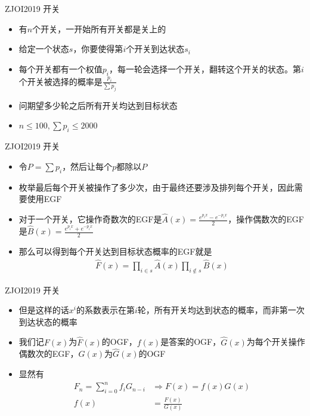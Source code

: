 \documentclass{beamer}
\begin{document}
\begin{frame}{ZJOI2019 开关}
    \begin{itemize}
        \item 有$n$个开关，一开始所有开关都是关上的
        \item 给定一个状态$s$，你要使得第$i$个开关到达状态$s_i$
        \item 每个开关都有一个权值$p_i$，每一轮会选择一个开关，翻转这个开关的状态。第$i$个开关被选择的概率是$\frac{p_i}{\sum p_j}$
        \item 问期望多少轮之后所有开关均达到目标状态
        \item $n\leq 100, \sum p_i\leq 2000$
    \end{itemize}
\end{frame}

\begin{frame}{ZJOI2019 开关}
    \begin{itemize}
        \item 令$P = \sum p_i$，然后让每个$p$都除以$P$
        \item 枚举最后每个开关被操作了多少次，由于最终还要涉及排列每个开关，因此需要使用EGF
        \item 对于一个开关，它操作奇数次的EGF是$\hat A(x) = \frac{e^{p_ix} - e^{-p_ix}}{2}$，操作偶数次的EGF是$\hat B(x) = \frac{e^{p_ix} + e^{-p_ix}}{2}$
        \item 那么可以得到每个开关达到目标状态概率的EGF就是
        $$\begin{aligned}
            \hat F(x) = \prod_{i\in s} \hat A(x) \prod_{i\notin s} \hat B(x)
        \end{aligned}$$
    \end{itemize}
\end{frame}

\begin{frame}{ZJOI2019 开关}
    \begin{itemize}
        \item 但是这样的话$x^i$的系数表示在第$i$轮，所有开关均达到状态的概率，而非第一次到达状态的概率
        \item 我们记$F(x)$为$\hat F(x)$的OGF，$f(x)$是答案的OGF，$\hat G(x)$为每个开关操作偶数次的EGF，$G(x)$为$\hat G(x)$的OGF
        \item 显然有
        $$\begin{aligned}
            F_n = \sum_{i = 0}^n f_i G_{n - i} &\Rightarrow F(x) = f(x)G(x)\\
            f(x) &= \frac{F(x)}{G(x)}
        \end{aligned}$$
    \end{itemize}
\end{frame}
\end{document}
